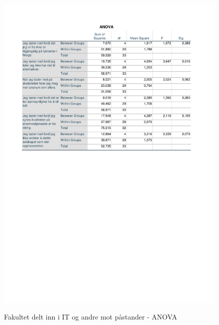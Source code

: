 \begin{figure}[H]
    \centering
    \includegraphics[scale=0.7]{case_1/bilder/ANOVA_fakultet-pastand.pdf}
    \label{fig:ANOVA_IT/ANDRE-påstand}
    \caption{Fakultet delt inn i IT og andre mot påstander - ANOVA}
\end{figure}


